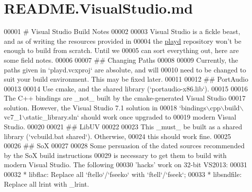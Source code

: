 \hypertarget{README_8VisualStudio_8md_source}{\section{R\+E\+A\+D\+M\+E.\+Visual\+Studio.\+md}
}

\begin{DoxyCode}
00001 \textcolor{preprocessor}{# Visual Studio Build Notes}
00002 
00003 Visual Studio is a fickle beast, and as of writing the resources provided in
00004 the \hyperlink{classplayd}{playd} repository won\textcolor{stringliteral}{'t be enough to build from scratch.  Until we}
00005 \textcolor{stringliteral}{can sort everything out, here are some field notes.}
00006 \textcolor{stringliteral}{}
00007 \textcolor{stringliteral}{## Changing Paths}
00008 \textcolor{stringliteral}{}
00009 \textcolor{stringliteral}{Currently, the paths given in `playd.vcxproj` are absolute, and will}
00010 \textcolor{stringliteral}{need to be changed to suit your build environment.  This may be fixed later.}
00011 \textcolor{stringliteral}{}
00012 \textcolor{stringliteral}{## PortAudio}
00013 \textcolor{stringliteral}{}
00014 \textcolor{stringliteral}{Use cmake, and the shared library (`portaudio-x86.lib`).}
00015 \textcolor{stringliteral}{}
00016 \textcolor{stringliteral}{The C++ bindings are \_not\_ built by the cmake-generated Visual Studio}
00017 \textcolor{stringliteral}{solution.  However, the Visual Studio 7.1 solution in}
00018 \textcolor{stringliteral}{`bindings\(\backslash\)cpp\(\backslash\)build\(\backslash\)vc7\_1\(\backslash\)static\_library.sln` should work once upgraded to}
00019 \textcolor{stringliteral}{modern Visual Studio.}
00020 \textcolor{stringliteral}{}
00021 \textcolor{stringliteral}{## LibUV}
00022 \textcolor{stringliteral}{}
00023 \textcolor{stringliteral}{This \_must\_ be built as a shared library (`vcbuild.bat shared`).  Otherwise,}
00024 \textcolor{stringliteral}{this should work fine.}
00025 \textcolor{stringliteral}{}
00026 \textcolor{stringliteral}{## SoX}
00027 \textcolor{stringliteral}{}
00028 \textcolor{stringliteral}{Some persuasion of the dated sources recommended by the SoX build instructions}
00029 \textcolor{stringliteral}{is necessary to get them to build with modern Visual Studio.  The following}
00030 \textcolor{stringliteral}{'}hacks\textcolor{stringliteral}{' work on 32-bit VS2013:}
00031 \textcolor{stringliteral}{}
00032 \textcolor{stringliteral}{* libflac: Replace all `ftello`/`fseeko` with `ftell`/`fseek`;}
00033 \textcolor{stringliteral}{* libsndfile: Replace all lrint with \_lrint.}

\end{DoxyCode}
